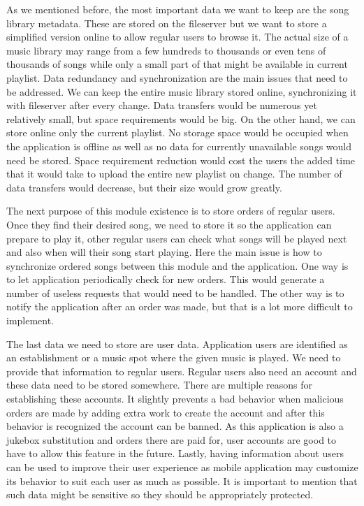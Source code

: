As we mentioned before, the most important data we want to keep are the song library metadata. These are stored on the fileserver but we want to store a simplified version online to allow regular users to browse it. The actual size of a music library may range from a few hundreds to thousands or even tens of thousands of songs while only a small part of that might be available in current playlist. Data redundancy and synchronization are the main issues that need to be addressed. We can keep the entire music library stored online, synchronizing it with fileserver after every change. Data transfers would be numerous yet relatively small, but space requirements would be big. On the other hand, we can store online only the current playlist. No storage space would be occupied when the application is offline as well as no data for currently unavailable songs would need be stored. Space requirement reduction would cost the users the added time that it would take to upload the entire new playlist on change. The number of data transfers would decrease, but their size would grow greatly.
\par
The next purpose of this module existence is to store orders of regular users. Once they find their desired song, we need to store it so the application can prepare to play it, other regular users can check what songs will be played next and also when will their song start playing. Here the main issue is how to synchronize ordered songs between this module and the application. One way is to let application periodically check for new orders. This would generate a number of useless requests that would need to be handled. The other way is to notify the application after an order was made, but that is a lot more difficult to implement.
\par
The last data we need to store are user data. Application users are identified as an establishment or a music spot where the given music is played. We need to provide that information to regular users. Regular users also need an account and these data need to be stored somewhere. There are multiple reasons for establishing these accounts. It slightly prevents a bad behavior when malicious orders are made by adding extra work to create the account and after this behavior is recognized the account can be banned. As this application is also a jukebox substitution and orders there are paid for, user accounts are good to have to allow this feature in the future. Lastly, having information about users can be used to improve their user experience as mobile application may customize its behavior to suit each user as much as possible. It is important to mention that such data might be sensitive so they should be appropriately protected.

